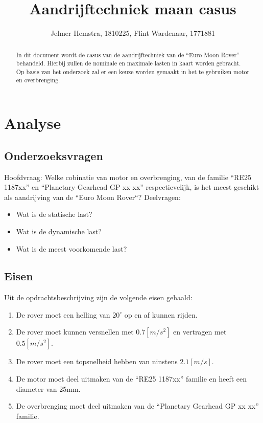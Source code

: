 \documentclass{article}
\title{Aandrijftechniek maan casus}
\author{Jelmer Hemstra, 1810225, Flint Wardenaar, 1771881}
\begin{document}
    \begin{abstract}
        In dit document wordt de casus van de aandrijftechniek van de ``Euro Moon Rover'' behandeld. 
        Hierbij zullen de nominale en maximale lasten in kaart worden gebracht.
        Op basis van het onderzoek zal er een keuze worden gemaakt in het te gebruiken motor en overbrenging.
    \end{abstract}

    \section{Analyse}
        \subsection{Onderzoeksvragen}
            Hoofdvraag: \newline
            Welke cobinatie van motor en overbrenging, 
            van de familie ``RE25 1187xx'' en ``Planetary Gearhead GP xx xx'' respectievelijk, 
            is het meest geschikt als aandrijving van de ``Euro Moon Rover``?
            \newline \newline
            Deelvragen: 
            \begin{itemize}
                \item Wat is de statische last?
                \item Wat is de dynamische last?
                \item Wat is de meest voorkomende last?
            \end{itemize}

        \subsection{Eisen}
            Uit de opdrachtsbeschrijving zijn de volgende eisen gehaald:
            \begin{enumerate}
                \item De rover moet een helling van $20^{\circ}$ op en af kunnen rijden.
                \item De rover moet kunnen versnellen met $0.7[m/s^2]$ en vertragen met $0.5[m/s^2]$.
                \item De rover moet een topsnelheid hebben van ninstens $2.1[m/s]$.
                \item De motor moet deel uitmaken van de ``RE25 1187xx'' familie en heeft een diameter van 25mm.
                \item De overbrenging moet deel uitmaken van de ``Planetary Gearhead GP xx xx'' familie.
            \end{enumerate}
        
\end{document}
